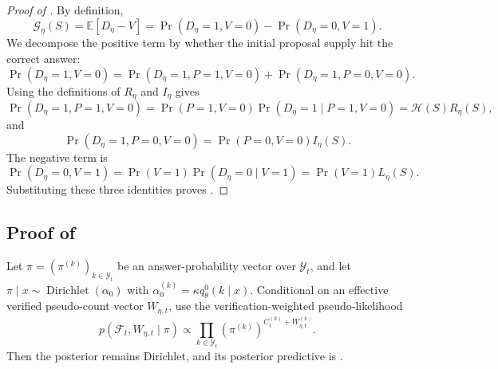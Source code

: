 \begin{proof}[Proof of ]
By definition,
\[
    \mathcal G_\eta(S)=\mathbb E[D_\eta-V]
    =
    \Pr(D_\eta=1,V=0)-\Pr(D_\eta=0,V=1).
\]
We decompose the positive term by whether the initial proposal supply hit the
correct answer:
\[
\Pr(D_\eta=1,V=0)
=
\Pr(D_\eta=1,P=1,V=0)
+
\Pr(D_\eta=1,P=0,V=0).
\]
Using the definitions of $R_\eta$ and $I_\eta$ gives
\[
\Pr(D_\eta=1,P=1,V=0)
=
\Pr(P=1,V=0)\Pr(D_\eta=1\mid P=1,V=0)
=
\mathcal H(S)R_\eta(S),
\]
and
\[
\Pr(D_\eta=1,P=0,V=0)
=
\Pr(P=0,V=0)I_\eta(S).
\]
The negative term is
\[
\Pr(D_\eta=0,V=1)
=
\Pr(V=1)\Pr(D_\eta=0\mid V=1)
=
\Pr(V=1)L_\eta(S).
\]
Substituting these three identities proves
.
\end{proof}

\subsection{Proof of }
\label{app:proof_verification_weighted_conjugacy}

\begin{lemma}
\label{lem:verification_weighted_conjugacy}
Let $\pi=(\pi^{(k)})_{k\in\mathcal Y_t}$ be an answer-probability vector over
$\mathcal Y_t$, and let
$\pi\mid x\sim\operatorname{Dirichlet}(\alpha_0)$ with
$\alpha_0^{(k)}=\kappa q_\theta^0(k\mid x)$. Conditional on an effective
verified pseudo-count vector $W_{\eta,t}$, use the verification-weighted
pseudo-likelihood
\[
    p(\mathcal F_t,W_{\eta,t}\mid \pi)
    \propto
    \prod_{k\in\mathcal Y_t}
    \left(\pi^{(k)}\right)^{C_t^{(k)}+W_{\eta,t}^{(k)}}.
\]
Then the posterior remains Dirichlet, and its posterior predictive is
.
\end{lemma}

